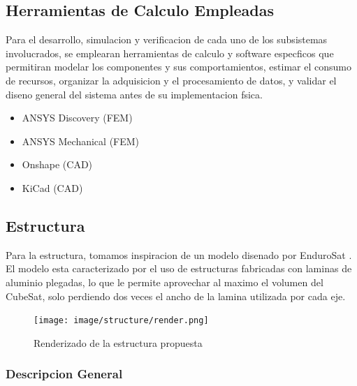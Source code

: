   \subsection{Herramientas de Calculo Empleadas}
    Para el desarrollo, simulacion y verificacion de cada uno de los subsistemas involucrados,
    se emplearan herramientas de calculo y software especficos que permitiran modelar los componentes
    y sus comportamientos, estimar el consumo de recursos, organizar la adquisicion y
    el procesamiento de datos, y validar el diseno general del sistema antes de su implementacion
    fsica.

    \begin{itemize}
      \item ANSYS Discovery (FEM)
      \item ANSYS Mechanical (FEM)
      \item Onshape (CAD)
      \item KiCad (CAD)
    \end{itemize}

  \subsection{Estructura}
    Para la estructura, tomamos inspiracion de un modelo disenado por EnduroSat \cite{endurosat}. El
    modelo esta caracterizado por el uso de estructuras fabricadas con laminas de aluminio
    plegadas, lo que le permite aprovechar al maximo el volumen del CubeSat, solo perdiendo
    dos veces el ancho de la lamina utilizada por cada eje.

    \begin{figure}[H]
      \centering
      \texttt{[image: image/structure/render.png]}
      \caption{Renderizado de la estructura propuesta}
      \label{fig:render}
    \end{figure}

    \subsubsection{Descripcion General}

